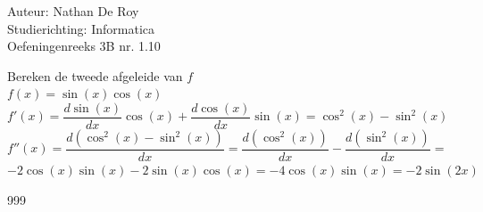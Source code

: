 \documentclass[a4paper]{article}
\begin{document}
\noindent \large Auteur: Nathan De Roy \\
\noindent \large Studierichting: Informatica\\
\noindent \large Oefeningenreeks 3B nr. 1.10\\

\medskip

\normalsize


\noindent Bereken de tweede afgeleide van $f$\\

$f(x) = \sin(x) \cos(x)$\\

$f'(x) = \dfrac{d \sin(x)}{dx} \cos(x) + \dfrac{d \cos(x)}{dx} \sin(x) = \cos^2(x) - \sin^2(x)$\\

$f''(x) = \dfrac{d(\cos^2(x) - \sin^2(x))}{dx} = \dfrac{d(\cos^2(x))}{dx} - \dfrac{d(\sin^2(x))}{dx} = $\\

$-2\cos(x)\sin(x) - 2\sin(x)\cos(x) = - 4 \cos(x)\sin(x) = -2 \sin(2x)$\\

\begin{thebibliography}{999}
\end{thebibliography}
\end{document}
